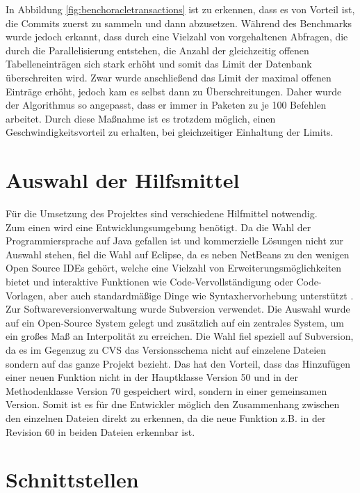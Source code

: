 In Abbildung \ref{fig:benchoracletransactions} ist zu erkennen, dass es von Vorteil ist, die Commits zuerst zu sammeln und dann abzusetzen.
Während des Benchmarks wurde jedoch erkannt, dass durch eine Vielzahl von vorgehaltenen Abfragen, die durch die Parallelisierung entstehen, die Anzahl der gleichzeitig offenen Tabelleneinträgen sich stark erhöht und somit das Limit der Datenbank überschreiten wird.
Zwar wurde anschließend das Limit der maximal offenen Einträge erhöht, jedoch kam es selbst dann zu Überschreitungen. Daher wurde der Algorithmus so angepasst, dass er immer in Paketen zu je 100 Befehlen arbeitet. Durch diese Maßnahme ist es trotzdem möglich, einen Geschwindigkeitsvorteil zu erhalten, bei gleichzeitiger Einhaltung der Limits.

\section{Auswahl der Hilfsmittel}
\label{sec:hilfsmittelwahl}

Für die Umsetzung des Projektes sind verschiedene Hilfmittel notwendig.\\
Zum einen wird eine Entwicklungsumgebung benötigt.
Da die Wahl der Programmiersprache auf Java gefallen ist und kommerzielle Lösungen nicht zur Auswahl stehen, fiel die Wahl auf Eclipse, da es neben NetBeans zu den wenigen Open Source IDEs gehört, welche eine Vielzahl von Erweiterungsmöglichkeiten bietet und interaktive Funktionen wie Code-Vervollständigung oder Code-Vorlagen, aber auch standardmäßige Dinge wie Syntaxhervorhebung unterstützt .\\

Zur Softwareversionverwaltung wurde Subversion verwendet.
Die Auswahl wurde auf ein Open-Source System gelegt und zusätzlich auf ein zentrales System, um ein großes Maß an Interpolität zu erreichen.
Die Wahl fiel speziell auf Subversion, da es im Gegenzug zu CVS das Versionsschema nicht auf einzelene Dateien sondern auf das ganze Projekt bezieht.
Das hat den Vorteil, dass das Hinzufügen einer neuen Funktion nicht in der Hauptklasse Version 50 und in der Methodenklasse Version 70 gespeichert wird, sondern in einer gemeinsamen Version.
Somit ist es für dne Entwickler möglich den Zusammenhang zwischen den einzelnen Dateien direkt zu erkennen, da die neue Funktion z.B. in der Revision 60 in beiden Dateien erkennbar ist.\\

\section{Schnittstellen}
\label{sec:schnitt}

